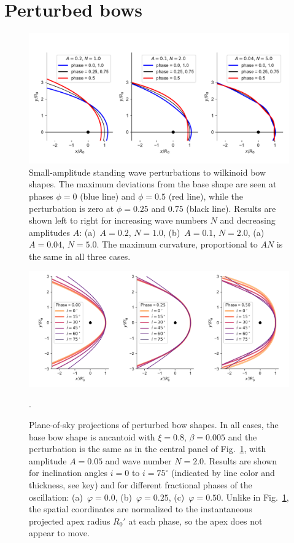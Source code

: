 \section{Perturbed bows}
\label{sec:perturbed-bows}

\begin{figure}
  \centering
  \includegraphics[width=\linewidth]{figs/compare_xyprime_wave-wilkinoid}
  \caption{Small-amplitude standing wave perturbations to wilkinoid
    bow shapes.  The maximum deviations from the base shape are seen
    at phases \(\phi = 0\) (blue line) and \(\phi = 0.5\) (red line), while
    the perturbation is zero at \(\phi = 0.25\) and \(0.75\) (black
    line).  Results are shown left to right for increasing wave
    numbers \(N\) and decreasing amplitudes \(A\): (a)~\(A = 0.2\),
    \(N = 1.0\), (b)~\(A = 0.1\), \(N = 2.0\), (a)~\(A = 0.04\),
    \(N = 5.0\).  The maximum curvature, proportional to \(A N\) is
    the same in all three cases.}
  \label{fig:perturb-shapes}
\end{figure}
\begin{figure}
  \centering
  \includegraphics[width=\linewidth]
  {figs/wave_xyprime-A010-N20-ancantoid-xi080-beta000500}
  \caption{Plane-of-sky projections of perturbed bow shapes.  In all
    cases, the base bow shape is ancantoid with \(\xi = 0.8\),
    \(\beta = 0.005\) and the perturbation is the same as in the central
    panel of Fig.~\ref{fig:perturb-shapes}, with amplitude
    \(A = 0.05\) and wave number \(N = 2.0\). Results are shown for
    inclination angles \(i = 0\) to \(i = 75^\circ\) (indicated by line
    color and thickness, see key) and for different fractional phases
    of the oscillation: (a)~\(\varphi = 0.0\), (b)~\(\varphi = 0.25\),
    (c)~\(\varphi = 0.50\). Unlike in Fig.~\ref{fig:perturb-shapes},
    the spatial coordinates are normalized to the instantaneous
    projected apex radius \(R_0'\) at each phase, so the apex does not
    appear to move.}.
  \label{fig:perturb-xy-prime}
\end{figure}

